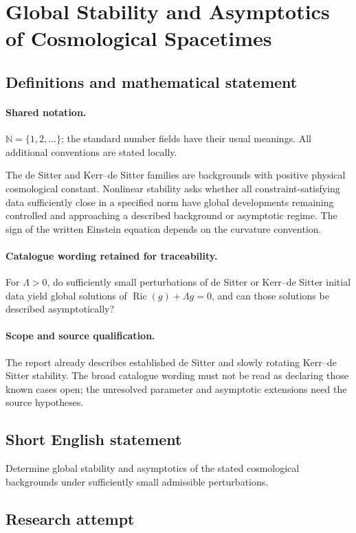 \documentclass[11pt]{article}
\begin{document}
\section{Global Stability and Asymptotics of Cosmological Spacetimes}\label{statement}

\subsection{Definitions and mathematical statement}

\paragraph{Shared notation.}$\mathbb N=\{1,2,\ldots\}$; the standard number fields have their usual meanings. All additional conventions are stated locally.


The de Sitter and Kerr--de Sitter families are backgrounds with positive physical cosmological constant. Nonlinear stability asks whether all constraint-satisfying data sufficiently close in a specified norm have global developments remaining controlled and approaching a described background or asymptotic regime. The sign of the written Einstein equation depends on the curvature convention.

\paragraph{Catalogue wording retained for traceability.}
For $\Lambda>0$, do sufficiently small perturbations of de Sitter or Kerr–de Sitter initial data yield global solutions of $\operatorname{Ric}(g)+\Lambda g=0$, and can those solutions be described asymptotically?

\paragraph{Scope and source qualification.}The report already describes established de Sitter and slowly rotating Kerr--de Sitter stability. The broad catalogue wording must not be read as declaring those known cases open; the unresolved parameter and asymptotic extensions need the source hypotheses.
\subsection{Short English statement}
Determine global stability and asymptotics of the stated cosmological backgrounds under sufficiently small admissible perturbations.
\subsection{Research attempt}
\end{document}
